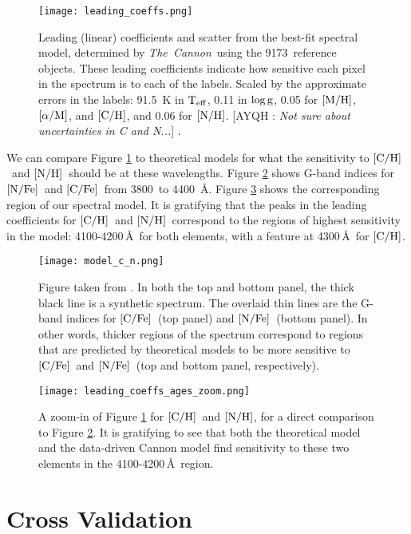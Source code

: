 \documentclass[12pt, preprint]{aastex}
\newcommand{\tc}{\textsl{The~Cannon}}
\newcommand{\teff}{\mbox{$\rm T_{eff}$}}
\newcommand{\logg}{\mbox{$\rm \log g$}}
\newcommand{\mh}{\mbox{$\rm [M/H]$}}
\newcommand{\alpham}{\mbox{$\rm [\alpha/M]$}}
\newcommand{\carbon}{\mbox{$\rm [C/H]$}}
\newcommand{\cfe}{\mbox{$\rm [C/Fe]$}}
\newcommand{\nitrogen}{\mbox{$\rm [N/H]$}}
\newcommand{\nfe}{\mbox{$\rm [N/Fe]$}}
\newcommand{\angstrom}{\mbox{\AA}}
\newcommand{\ntrobj}{9173}
\newcommand{\Comment}[2]{ [{\color{red}\sc #1 :} {{\color{cyan} \it #2}}]}
\begin{document}
\begin{figure}[!p]
\centering
\texttt{[image: leading\_coeffs.png]}
\caption{Leading (linear) coefficients and scatter 
  from the best-fit spectral model, 
determined by \tc\ using the \ntrobj\ reference objects. 
These leading coefficients indicate how sensitive each pixel 
in the spectrum is to each of the labels. 
Scaled by the approximate errors in the labels:
91.5~K in \teff, 0.11 in \logg, 0.05 for \mh, \alpham, and \carbon, 
and 0.06 for \nitrogen. 
\Comment{AYQH}{Not sure about uncertainties in C and N...}
\citep{Holtzman2015}.}
\label{fig:leading-coeffs}
\end{figure}

We can compare Figure \ref{fig:leading-coeffs} to 
theoretical models for what the sensitivity to
\carbon\ and \nitrogen\ should be
at these wavelengths. Figure \ref{fig:model-cn}
shows G-band indices for \nfe\ and \cfe\ from
3800\, to 4400\, \angstrom. Figure \ref{fig:cannon-cn}
shows the corresponding region of our spectral model.
It is gratifying that the peaks in the leading coefficients
for \carbon\ and \nitrogen\ correspond to the regions
of highest sensitivity in the model: 4100-4200\,\angstrom\ 
for both elements, with a feature at 4300\,\angstrom\ for 
\carbon. 

\begin{figure}[!p]
\centering
\texttt{[image: model\_c\_n.png]}
\caption{
Figure taken from \citet{Martell2008}. In both the 
top and bottom panel, the thick black line is
a synthetic spectrum. The overlaid thin lines are
the G-band indices for \cfe\ (top panel) and
\nfe\ (bottom panel). In other words, thicker
regions of the spectrum correspond to regions that
are predicted by theoretical models to be more 
sensitive to \cfe\ and \nfe\ (top and bottom panel, respectively). 
}
\label{fig:model-cn}
\end{figure}

\begin{figure}[!p]
\centering
\texttt{[image: leading\_coeffs\_ages\_zoom.png]}
\caption{
A zoom-in of Figure \ref{fig:leading-coeffs} for 
\carbon\ and \nitrogen, 
for a direct comparison to Figure \ref{fig:model-cn}.
It is gratifying to see that both the theoretical model and the data-driven Cannon
model find sensitivity to these two elements
in the 4100-4200\,\angstrom\ region. 
}
\label{fig:cannon-cn}
\end{figure}

\section{Cross Validation}
\end{document}
